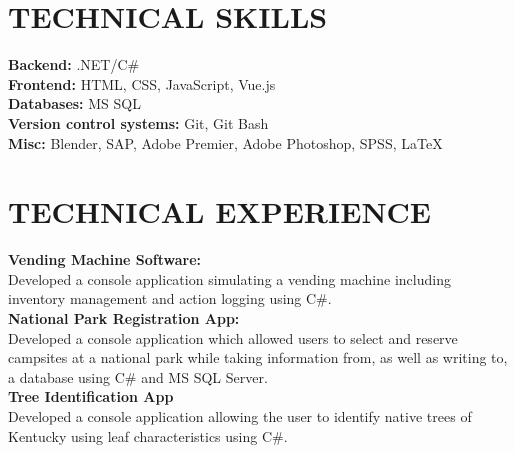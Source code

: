 \documentclass[margin,line]{resume}
\begin{document}
\begin{resume}
    \vspace{1mm}

\sectionline

\vspace{2mm}
    \section{\mysidestyle \textbf{\large{T}\small{ECHNICAL}  \large{S}\small{KILLS}}}

    \textbf{Backend:} .NET/C\#\vspace{1mm}\\
    \textbf{Frontend:} HTML, CSS, JavaScript, Vue.js\vspace{1mm}\\
    \textbf{Databases:} MS SQ\vspace{1mm}L\\
    \textbf{Version control systems:} Git, Git Bash\vspace{1mm}\\
    \textbf{Misc:} Blender, SAP, Adobe Premier, Adobe Photoshop, SPSS, LaTeX
\vspace{1mm}

\sectionline

\vspace{2mm}
    \section{\mysidestyle \textbf{\large{T}\small{ECHNICAL} \large{E}\small{XPERIENCE}}}
     \textbf{\listing Vending Machine Software:} \vspace{1mm}\\\vspace{0mm}%
Developed a console application simulating a vending machine including inventory management and action logging using C\#.\vspace{2mm}\\
\textbf{\listing National Park Registration App:} \vspace{1mm}\\\vspace{0mm}%
Developed a console application which allowed users to select and reserve campsites at a national park while taking information from, as well as writing to, a database using C\# and MS SQL Server.\vspace{2mm}\\
	\textbf{\listing Tree Identification App} \vspace{1mm}\\\vspace{0mm}%
Developed a console application allowing the user to identify native trees of Kentucky using leaf characteristics using C\#.


\end{resume}
\end{document}

